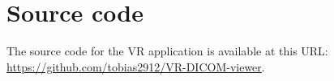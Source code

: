 \chapter{Source code} \label{SourceCode}

The source code for the VR application is available at this URL: \url{https://github.com/tobias2912/VR-DICOM-viewer}.
